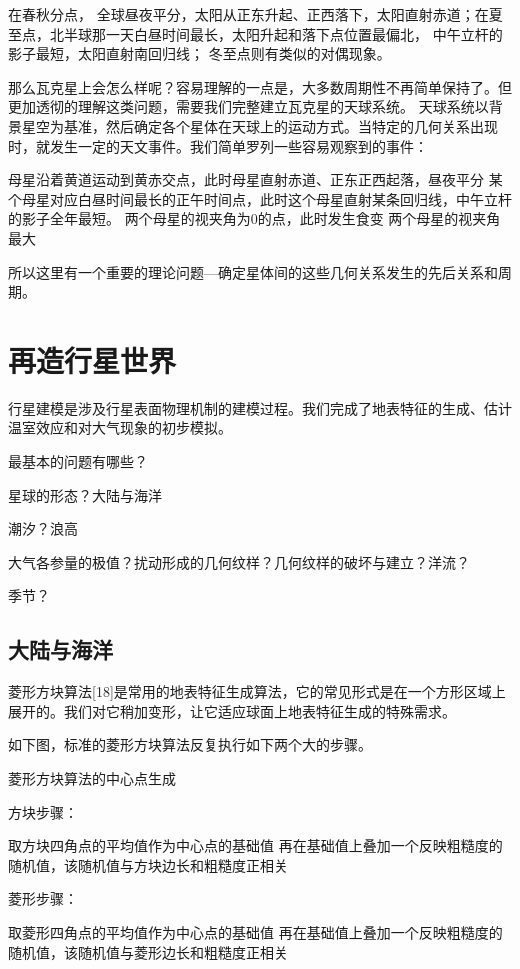 \documentclass[a4paper,10.5pt]{book}
\begin{document}
在春秋分点， 全球昼夜平分，太阳从正东升起、正西落下，太阳直射赤道；在夏至点，北半球那一天白昼时间最长，太阳升起和落下点位置最偏北，
中午立杆的影子最短，太阳直射南回归线； 冬至点则有类似的对偶现象。

那么瓦克星上会怎么样呢？容易理解的一点是，大多数周期性不再简单保持了。但更加透彻的理解这类问题，需要我们完整建立瓦克星的天球系统。
天球系统以背景星空为基准，然后确定各个星体在天球上的运动方式。当特定的几何关系出现时，就发生一定的天文事件。我们简单罗列一些容易观察到的事件：

母星沿着黄道运动到黄赤交点，此时母星直射赤道、正东正西起落，昼夜平分
某个母星对应白昼时间最长的正午时间点，此时这个母星直射某条回归线，中午立杆的影子全年最短。
两个母星的视夹角为0的点，此时发生食变
两个母星的视夹角最大

所以这里有一个重要的理论问题—确定星体间的这些几何关系发生的先后关系和周期。




\chapter{再造行星世界}

行星建模是涉及行星表面物理机制的建模过程。我们完成了地表特征的生成、估计温室效应和对大气现象的初步模拟。

最基本的问题有哪些？

星球的形态？大陆与海洋

潮汐？浪高

大气各参量的极值？扰动形成的几何纹样？几何纹样的破坏与建立？洋流？

季节？

\section{大陆与海洋}

菱形方块算法[18]是常用的地表特征生成算法，它的常见形式是在一个方形区域上展开的。我们对它稍加变形，让它适应球面上地表特征生成的特殊需求。

如下图，标准的菱形方块算法反复执行如下两个大的步骤。


菱形方块算法的中心点生成

方块步骤：

取方块四角点的平均值作为中心点的基础值
再在基础值上叠加一个反映粗糙度的随机值，该随机值与方块边长和粗糙度正相关

菱形步骤：

取菱形四角点的平均值作为中心点的基础值
再在基础值上叠加一个反映粗糙度的随机值，该随机值与菱形边长和粗糙度正相关
\end{document}
